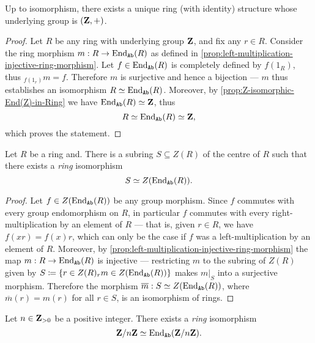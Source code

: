 %
\begin{proposition}
    \label{prop:unique-ring-structure-Z}
    Up to isomorphism, there exists a unique ring (with identity) structure whose
    underlying group is \((\mathbf{Z}, +)\).
\end{proposition}
%

%
\begin{proof}
    Let \(R\) be any ring with underlying group \(\mathbf{Z}\), and fix any \(r \in
    R\). Consider the ring morphism \(m: R \to \operatorname{End}_{{\texttt{Ab}}}(R)\) as defined in
    \cref{prop:left-multiplication-injective-ring-morphism}. Let
    \(f \in \operatorname{End}_{{\texttt{Ab}}}(R)\) is completely defined by \(f(1_R)\), thus
    \({}_{f(1_r)}m = f\). Therefore \(m\) is surjective and hence a bijection ---
    \(m\) thus establishes an isomorphism \(R \simeq \operatorname{End}_{{\texttt{Ab}}}(R)\). Moreover, by
    \cref{prop:Z-isomorphic-End(Z)-in-Ring} we have \(\operatorname{End}_{{\texttt{Ab}}}(R) \simeq \mathbf{Z}\), thus
    \[
        R \simeq \operatorname{End}_{{\texttt{Ab}}}(R) \simeq \mathbf{Z},
    \]
    which proves the statement.
\end{proof}
%

%
\begin{proposition}
    \label{prop:center-ring-iso-center-End(R)}
    Let \(R\) be a ring and. There is a subring \(S \subseteq Z(R)\) of the
    centre of \(R\) such that there exists a \emph{ring} isomorphism
    \[
        S \simeq Z(\operatorname{End}_{{\texttt{Ab}}}(R)).
    \]
\end{proposition}
%

%
\begin{proof}
    Let \(f \in Z(\operatorname{End}_{{\texttt{Ab}}}(R))\) be any group morphism. Since \(f\) commutes with
    every group endomorphism on \(R\), in particular \(f\) commutes with every
    right-multiplication by an element of \(R\) --- that is, given \(r \in R\), we
    have \(f(x r) = f(x) r\), which can only be the case if \(f\) was a
    left-multiplication by an element of \(R\). Moreover, by
    \cref{prop:left-multiplication-injective-ring-morphism} the map
    \(m: R \to \operatorname{End}_{{\texttt{Ab}}}(R)\) is injective --- restricting \(m\) to the subring of
    \(Z(R)\) given by
    \(S \coloneq \{r \in Z(R) \relax {}_rm \in Z(\operatorname{End}_{{\texttt{Ab}}}(R))\}\) makes \(m|_S\)
    into a surjective morphism. Therefore the morphism
    \(\overline{m}: S \simeq Z(\operatorname{End}_{{\texttt{Ab}}}(R))\), where \(\overline{m}(r) = m(r)\) for
    all \(r \in S\), is an isomorphism of rings.
\end{proof}
%

%
\begin{corollary}
    \label{cor:Z/nZ-iso-End(Z/nZ)}
    Let \(n \in \mathbf{Z}_{> 0}\) be a positive integer. There exists a \emph{ring}
    isomorphism
    \[
        \mathbf{Z}/n\mathbf{Z} \simeq \operatorname{End}_{{\texttt{Ab}}}(\mathbf{Z}/n\mathbf{Z}).
    \]
\end{corollary}
%

